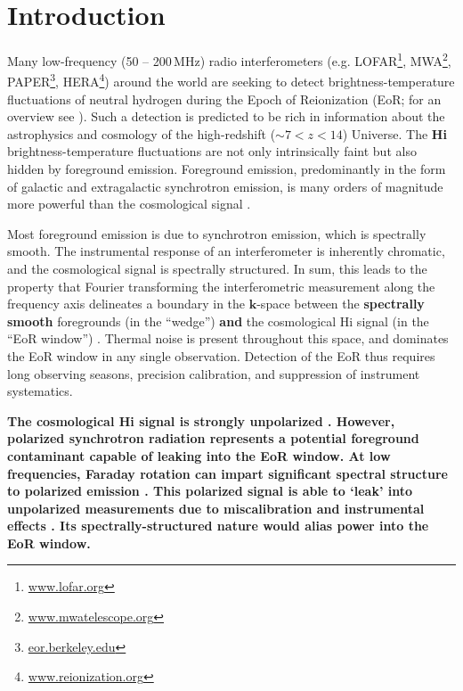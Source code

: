 \documentclass[twocolumn, trackchanges]{aastex61}
\newcommand{\edited}[1]{{\bf \color{red} #1}}
\begin{document}
\section{Introduction}
\label{sec:intro}

Many low-frequency (50 -- 200\,MHz) radio interferometers (e.g. LOFAR\footnote{\url{www.lofar.org}}, MWA\footnote{\url{www.mwatelescope.org}}, PAPER\footnote{\url{eor.berkeley.edu}}, HERA\footnote{\url{www.reionization.org}}) around the world are seeking to detect brightness-temperature fluctuations of neutral hydrogen during the Epoch of Reionization (EoR; for an overview see \citet{Furlanetto06}). 
Such a detection is predicted to be rich in information about the astrophysics and cosmology of the high-redshift ($\sim 7 < z < 14$) Universe.
The \edited{{\sc Hi}} brightness-temperature fluctuations are not only intrinsically faint but also hidden by foreground emission. Foreground emission, predominantly in the form of galactic and extragalactic synchrotron emission, is many orders of magnitude more powerful than the cosmological signal \citep[e.g.][]{Bernardi09, Pober13, Dillon14}.

Most foreground emission is due to synchrotron emission, which is spectrally smooth. The instrumental response of an interferometer is inherently chromatic, and the cosmological signal is spectrally structured. In sum, this leads to the property that Fourier transforming the interferometric measurement along the frequency axis delineates a boundary in the $\mathbf{k}$-space between the \edited{spectrally smooth}
foregrounds (in the ``wedge'') \edited{and} the cosmological {\sc Hi} signal (in the ``EoR window'')
\citep{Datta.10, Morales.12, Parsons.12a, Parsons.12b, Trott.12, Vedantham.12, Pober13, Thyagarajan.13, Pober.14, Liu.14a, Liu.14b, Dillon.15a, Dillon.15b, Nithya.15b, Nithya.15a}.
Thermal noise is present throughout this space, and dominates the EoR window in any single observation.
Detection of the EoR thus requires long observing seasons, precision calibration, and suppression of instrument systematics. 

\edited{The cosmological {\sc Hi} signal is strongly unpolarized \citep{Mishra.17}. However, polarized synchrotron radiation represents a potential foreground contaminant capable of leaking into the EoR window. At low frequencies, Faraday rotation can impart significant spectral structure to polarized emission \citep[e.g.][]{Moore13}. This polarized signal is able to `leak' into unpolarized measurements due to miscalibration and instrumental effects \citep{Carozzi.09, Geil.11, Moore13, Asad15, Asad.16, Kohn16, Nunhokee.17}. Its spectrally-structured nature would alias power into the EoR window.} 
\end{document}
